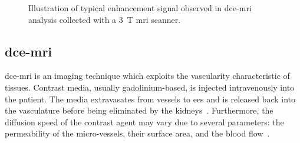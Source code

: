 \begin{figure}
  \centering
  \hspace*{\fill}
  \hfill
  \hspace*{\fill}
  \caption[Enhancement of \acs*{dce}-\acs*{mri} signal.]{Illustration of
    typical enhancement signal observed in \acs*{dce}-\acs*{mri} analysis
    collected with a \SI{3}{\tesla} \acs*{mri} scanner.}
  \label{fig:dceana}
\end{figure}

\subsection{\acs*{dce}-\acs*{mri}}\label{subsec:chp2:imaging:dce}
\Ac{dce}-\ac{mri} is an imaging technique which exploits the vascularity
characteristic of tissues.
Contrast media, usually gadolinium-based, is injected intravenously into the
patient.
The media extravasates from vessels to \ac{ees} and is released back into the
vasculature before being eliminated by the kidneys~\cite{Gribbestad2005}.
Furthermore, the diffusion speed of the contrast agent may vary due to several
parameters: the permeability of the micro-vessels, their surface area,
and the blood flow~\cite{Padhani2002}.

